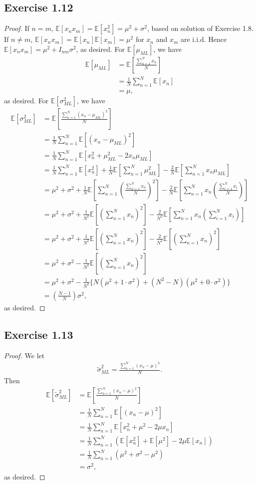 \documentclass[11pt]{article}
\theoremstyle{definition}
\newcommand{\E}{\mathbb{E}}
\begin{document}
\subsection{Exercise 1.12}
\begin{proof}
 If $n = m$, $\E[x_nx_m] = \E[x_n^2] = \mu^2 + \sigma^2$, based on solution of Exercise 1.8. If $n \not= m$, $\E[x_nx_m] = \E[x_n]\E[x_m] = \mu^2$ for $x_n$ and $x_m$ are i.i.d. Hence $\E[x_nx_m] = \mu^2 + I_{nm}\sigma^2$, as desired.
 For $\E[\mu_{ML}]$, we have
 \begin{align*}
\E[\mu_{ML}] &= \E[\frac{\sum^N_{n=1}x_n}{N}] \\
&= \frac{1}{N}\sum^N_{n=1}\E[x_n]\\
&= \mu,
\end{align*}
 as desired. For $\E[\sigma^2_{ML}]$, we have
\begin{align*}
\E[\sigma^2_{ML}] &= \E[\frac{\sum^N_{n=1}(x_n-\mu_{ML})^2}{N}] \\
&= \frac{1}{N}\sum^N_{n=1}\E[(x_n-\mu_{ML})^2] \\
&= \frac{1}{N}\sum^N_{n=1}\E[x_n^2 + \mu_{ML}^2 - 2x_n\mu_{ML}] \\
&= \frac{1}{N}\sum^N_{n=1}\E[x_n^2] + \frac{1}{N}\E[\sum^N_{n=1}\mu_{ML}^2] - \frac{2}{N}\E[\sum^N_{n=1}x_n\mu_{ML}]\\
&= \mu^2 + \sigma^2 + \frac{1}{N}\E[\sum^N_{n=1}(\frac{\sum^N_{n=1}x_n}{N})^2] - \frac{2}{N}\E[\sum^N_{n=1}x_n(\frac{\sum^N_{i=1}x_i}{N})] \\
&= \mu^2 + \sigma^2 + \frac{1}{N^2}\E[(\sum^N_{n=1}x_n)^2] - \frac{2}{N^2}\E[\sum^N_{n=1}x_n(\sum^N_{i=1}x_i)]\\
&= \mu^2 + \sigma^2 + \frac{1}{N^2}\E[(\sum^N_{n=1}x_n)^2] - \frac{2}{N^2}\E[(\sum^N_{n=1}x_n)^2] \\
&= \mu^2 + \sigma^2 - \frac{1}{N^2}\E[(\sum^N_{n=1}x_n)^2]\\
&= \mu^2 + \sigma^2 - \frac{1}{N^2}\{N(\mu^2 + 1\cdot\sigma^2) + (N^2-N)(\mu^2 + 0\cdot \sigma^2)\}\\
&= \left(\frac{N-1}{N}\right)\sigma^2,
\end{align*}
as desired.
\end{proof}

\subsection{Exercise 1.13}
\begin{proof}
We let
\begin{align*}
\widetilde{\sigma}^2_{ML} = \frac{\sum^N_{n=1}(x_n-\mu)^2}{N}.
\end{align*}
Then
\begin{align*}
\E[\widetilde{\sigma}^2_{ML}]&= \E[\frac{\sum^N_{n=1}(x_n-\mu)^2}{N}]\\
&=\frac{1}{N}\sum^N_{n=1}\E[(x_n-\mu)^2]\\
&=\frac{1}{N}\sum^N_{n=1}\E[x_n^2+\mu^2-2\mu x_n]\\
&=\frac{1}{N}\sum^N_{n=1}(\E[x_n^2]+\E[\mu^2]-2\mu\E[x_n])\\
&=\frac{1}{N}\sum^N_{n=1}(\mu^2+\sigma^2-\mu^2)\\
&=\sigma^2,
\end{align*}
as desired.
\end{proof}
\end{document}
